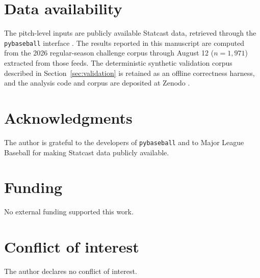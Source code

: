 \section*{Data availability}
The pitch-level inputs are publicly available Statcast data, retrieved through
the \texttt{pybaseball} interface \citep{pybaseball}. The results reported in
this manuscript are computed from the 2026 regular-season challenge corpus
through August 12 ($n = 1{,}971$) extracted from those feeds. The deterministic
synthetic validation corpus described in Section~\ref{sec:validation} is
retained as an offline correctness harness, and the analysis code and corpus
are deposited at Zenodo \citep{goldstein2026crv}.

\section*{Acknowledgments}
The author is grateful to the developers of \texttt{pybaseball} and to Major
League Baseball for making Statcast data publicly available.

\section*{Funding}
No external funding supported this work.

\section*{Conflict of interest}
The author declares no conflict of interest.
